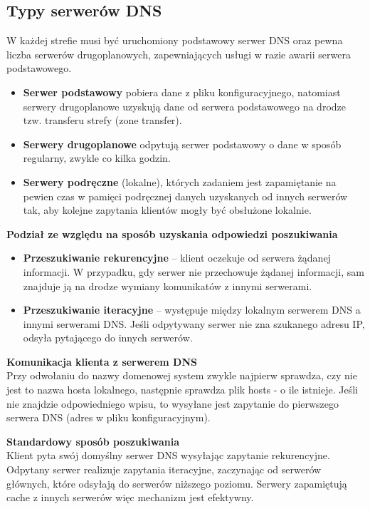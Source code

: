 \documentclass[../main.tex]{subfiles}
\begin{document}
    \subsection{Typy serwerów DNS}
    W każdej strefie musi być uruchomiony podstawowy serwer DNS oraz pewna liczba
    serwerów drugoplanowych, zapewniających usługi w razie awarii serwera podstawowego.

    \begin{itemize}
        \item \textbf{Serwer podstawowy} pobiera dane z pliku konfiguracyjnego, natomiast serwery
        drugoplanowe uzyskują dane od serwera podstawowego na drodze tzw. transferu strefy
        (zone transfer).
        \item \textbf{Serwery drugoplanowe} odpytują serwer podstawowy o dane w sposób
        regularny, zwykle co kilka godzin.
        \item \textbf{Serwery podręczne} (lokalne), których zadaniem jest zapamiętanie na pewien czas w
        pamięci podręcznej danych uzyskanych od innych serwerów tak, aby kolejne zapytania
        klientów mogły być obsłużone lokalnie.
    \end{itemize}

    \textbf{Podział ze względu na sposób uzyskania odpowiedzi poszukiwania}
    \begin{itemize}
        \item \textbf{Przeszukiwanie rekurencyjne} – klient oczekuje od serwera żądanej informacji. W przypadku,
        gdy serwer nie przechowuje żądanej informacji, sam znajduje ją na drodze wymiany
        komunikatów z innymi serwerami.
        \item \textbf{Przeszukiwanie iteracyjne} – występuje między lokalnym serwerem DNS a innymi serwerami
        DNS. Jeśli odpytywany serwer nie zna szukanego adresu IP, odsyła pytającego do innych
        serwerów.
    \end{itemize}

    \textbf{Komunikacja klienta z serwerem DNS}\\
    Przy odwołaniu do nazwy domenowej system zwykle najpierw sprawdza, czy nie jest to
    nazwa hosta lokalnego, następnie sprawdza plik hosts - o ile istnieje. Jeśli nie znajdzie odpowiedniego wpisu, to
    wysyłane jest zapytanie do pierwszego serwera DNS (adres w pliku
    konfiguracyjnym).

    \textbf{Standardowy sposób poszukiwania}\\
    Klient pyta swój domyślny serwer DNS wysyłając zapytanie rekurencyjne.
    Odpytany serwer realizuje zapytania iteracyjne, zaczynając od serwerów głównych, które
    odsyłają do serwerów niższego poziomu. Serwery zapamiętują cache z innych serwerów więc mechanizm jest efektywny.
\end{document}

